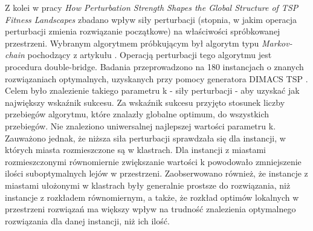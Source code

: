 Z kolei w pracy \textit{How Perturbation Strength Shapes the Global Structure of TSP Fitness Landscapes} \cite{DBLP:conf/evoW/McMenemyVO18} zbadano wpływ siły perturbacji (stopnia, w jakim operacja perturbacji zmienia rozwiązanie początkowe)
na właściwości spróbkowanej przestrzeni. Wybranym algorytmem próbkującym był algorytm typu \textit{Markov-chain} pochodzący z artykułu \cite{DBLP:journals/heuristics/OchoaV18}.
Operacją perturbacji tego algorytmu jest procedura double-bridge. Badania przeprowadzono na 180 instancjach o znanych rozwiązaniach optymalnych,
uzyskanych przy pomocy generatora DIMACS TSP . Celem było znalezienie takiego parametru k - siły perturbacji - aby uzyskać jak największy wskaźnik sukcesu.
Za wskaźnik sukcesu przyjęto stosunek liczby przebiegów algorytmu, które znalazły globalne optimum, do wszystkich przebiegów.
Nie znaleziono uniwersalnej najlepszej wartości parametru k. Zauważono jednak, że niższa siła perturbacji sprawdzała się dla instancji,
w których miasta rozmieszczone są w klastrach. Dla instancji z miastami rozmieszczonymi równomiernie zwiększanie wartości k powodowało
zmniejszenie ilości suboptymalnych lejów w przestrzeni.
Zaobserwowano również, że instancje z miastami ułożonymi w klastrach były generalnie prostsze do rozwiązania, niż instancje z rozkładem równomiernym,
a także, że rozkład optimów lokalnych w przestrzeni rozwiązań ma większy wpływ na trudność znalezienia optymalnego rozwiązania dla
danej instancji, niż ich ilość.
